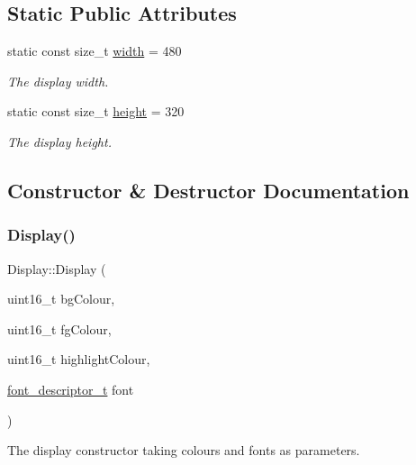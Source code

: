 \subsection*{Static Public Attributes}
\begin{DoxyCompactItemize}
\item 
\mbox{\label{classDisplay_a6f1dec624224569510e05c937d33ac4d}} 
static const size\+\_\+t \mbox{\hyperlink{classDisplay_a6f1dec624224569510e05c937d33ac4d}{width}} = 480
\begin{DoxyCompactList}\small\item\em The display width. \end{DoxyCompactList}\item 
\mbox{\label{classDisplay_ac677f0db63e8eef2373fe84791cad17c}} 
static const size\+\_\+t \mbox{\hyperlink{classDisplay_ac677f0db63e8eef2373fe84791cad17c}{height}} = 320
\begin{DoxyCompactList}\small\item\em The display height. \end{DoxyCompactList}\end{DoxyCompactItemize}


\subsection{Constructor \& Destructor Documentation}
\mbox{\label{classDisplay_a579fdca9754b50088f77dcb7ba3489ac}} 
\subsubsection{\texorpdfstring{Display()}{Display()}}
{\footnotesize\ttfamily Display\+::\+Display (\begin{DoxyParamCaption}\item[{uint16\+\_\+t}]{bg\+Colour,  }\item[{uint16\+\_\+t}]{fg\+Colour,  }\item[{uint16\+\_\+t}]{highlight\+Colour,  }\item[{\mbox{\hyperlink{structfont__descriptor__t}{font\+\_\+descriptor\+\_\+t}}}]{font }\end{DoxyParamCaption})}



The display constructor taking colours and fonts as parameters. 


